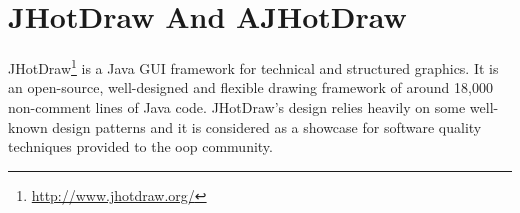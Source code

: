 
	





\section{JHotDraw And AJHotDraw}\label{JHotDraw And AJHotDraw}
JHotDraw\footnote{\url{http://www.jhotdraw.org/}} is a Java GUI framework for technical and structured graphics. 
It is an open-source, well-designed and flexible drawing framework of around 18,000 non-comment lines of Java code. 
JHotDraw's  design relies heavily on some well-known design patterns \cite{gamma1995design} and it is considered as a showcase for software quality techniques provided to the \ac{oop} community. 

